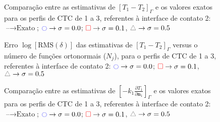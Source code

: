 
\begin{figure}[h!b]
	\caption{Comparação entre as estimativas de $[T_1 - T_2]_\Gamma$ e os valores exatos para os perfis de CTC de 1 a 3, referentes à interface de contato 2: $\text{--} \rightarrow \text{Exato}$; $\textcolor{blue}{\ocircle} \rightarrow \sigma = 0.0$; $\textcolor{red}{\square} \rightarrow \sigma = 0.1$, $\textcolor{gray}{\triangle} \rightarrow \sigma = 0.5$}
\end{figure}

\begin{figure}[h!b]
	\caption{Erro $\log[\text{RMS}(\delta)]$ das estimativas de $[T_1 - T_2]_\Gamma$ versus o número de funções ortonormais ($N_j$), para o perfis de CTC de 1 a 3, referentes à interface de contato 2: $\textcolor{blue}{\ocircle} \rightarrow \sigma = 0.0$; $\textcolor{red}{\square} \rightarrow \sigma = 0.1$, $\textcolor{gray}{\triangle} \rightarrow \sigma = 0.5$}
\end{figure}

\begin{figure}[h!b]
	\caption{Comparação entre as estimativas de $\left[-k_1 \frac{\partial T_1}{\partial\mathbf{n}_1}\right]_\Gamma$ e os valores exatos para os perfis de CTC de 1 a 3, referentes à interface de contato 2: $\text{--} \rightarrow \text{Exato}$; $\textcolor{blue}{\ocircle} \rightarrow \sigma = 0.0$; $\textcolor{red}{\square} \rightarrow \sigma = 0.1$, $\textcolor{gray}{\triangle} \rightarrow \sigma = 0.5$}
\end{figure}

